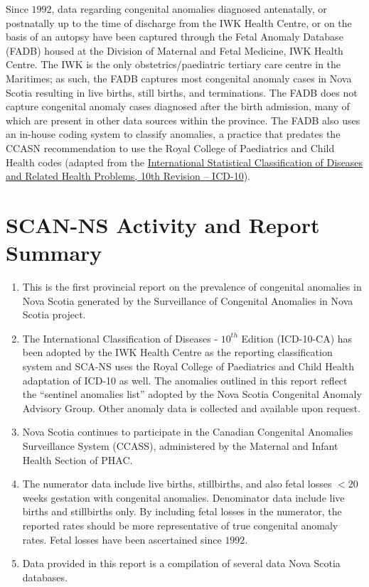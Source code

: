\documentclass[
]{krantz}
\begin{document}
Since \(1992\), data regarding congenital anomalies diagnosed antenatally, or postnatally up to the time of discharge from the IWK Health Centre, or on the basis of an autopsy have been captured through the Fetal Anomaly Database (FADB) housed at the Division of Maternal and Fetal Medicine, IWK Health Centre. The IWK is the only obstetrics/paediatric tertiary care centre in the Maritimes; as such, the FADB captures most congenital anomaly cases in Nova Scotia resulting in live births, still births, and terminations. The FADB does not capture congenital anomaly cases diagnosed after the birth admission, many of which are present in other data sources within the province. The FADB also uses an in-house coding system to classify anomalies, a practice that predates the CCASN recommendation to use the Royal College of Paediatrics and Child Health codes (adapted from the \href{https://www.google.ca/url?sa=t\&rct=j\&q=\&esrc=s\&source=web\&cd=\&ved=2ahUKEwi9rdLH6pT7AhU2kIkEHUtrDgIQFnoECBgQAQ\&url=https\%3A\%2F\%2Fapps.who.int\%2Firis\%2Fbitstream\%2Fhandle\%2F10665\%2F246208\%2F9789241549165-V1-eng.pdf\&usg=AOvVaw1TYOJuoOf2vUt7kCVsCziR}{International Statistical Classification of Diseases and Related Health Problems, 10th Revision -- ICD-10}).

\hypertarget{scan-ns-activity-and-report-summary}{%
\chapter*{SCAN-NS Activity and Report Summary}\label{scan-ns-activity-and-report-summary}}


\begin{enumerate}
\def\labelenumi{\arabic{enumi}.}
\item
  This is the first provincial report on the prevalence of congenital anomalies in Nova Scotia generated by the Surveillance of Congenital Anomalies in Nova Scotia project.
\item
  The International Classification of Diseases - \(10^{th}\) Edition (ICD-10-CA) has been adopted by the IWK Health Centre as the reporting classification system and SCA-NS uses the Royal College of Paediatrics and Child Health adaptation of ICD-10 as well. The anomalies outlined in this report reflect the ``sentinel anomalies list'' adopted by the Nova Scotia Congenital Anomaly Advisory Group. Other anomaly data is collected and available upon request.
\item
  Nova Scotia continues to participate in the Canadian Congenital Anomalies Surveillance System (CCASS), administered by the Maternal and Infant Health Section of PHAC.
\item
  The numerator data include live births, stillbirths, and also fetal losses \(< 20\) weeks gestation with congenital anomalies. Denominator data include live births and stillbirths only. By including fetal losses in the numerator, the reported rates should be more representative of true congenital anomaly rates. Fetal losses have been ascertained since \(1992\).
\item
  Data provided in this report is a compilation of several data Nova Scotia databases.
\end{enumerate}
\end{document}

